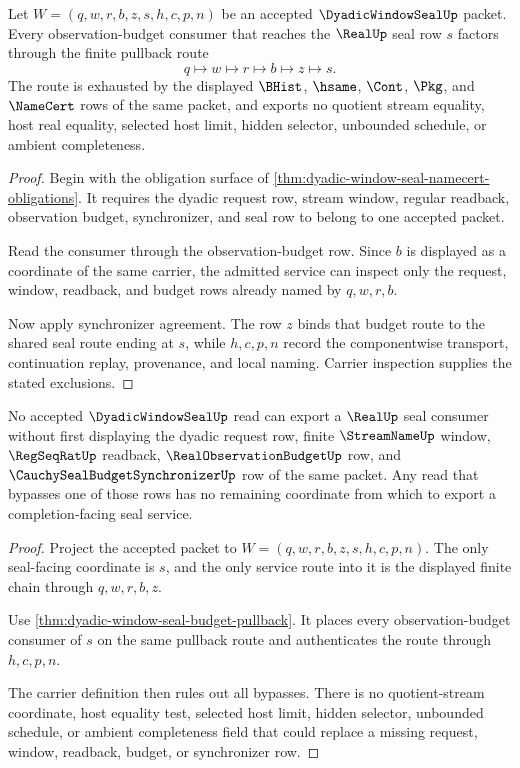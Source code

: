 \begin{theorem}
\label{thm:dyadic-window-seal-budget-pullback}
Let $W=(q,w,r,b,z,s,h,c,p,n)$ be an accepted $\DyadicWindowSealUp$ packet. Every observation-budget consumer that reaches the $\RealUp$ seal row $s$ factors through the finite pullback route
$$
q \longmapsto w \longmapsto r \longmapsto b \longmapsto z \longmapsto s.
$$
The route is exhausted by the displayed $\BHist$, $\hsame$, $\Cont$, $\Pkg$, and $\NameCert$ rows of the same packet, and exports no quotient stream equality, host real equality, selected host limit, hidden selector, unbounded schedule, or ambient completeness.
\end{theorem}
\begin{proof}
Begin with the obligation surface of \autoref{thm:dyadic-window-seal-namecert-obligations}. It requires the dyadic request row, stream window, regular readback, observation budget, synchronizer, and seal row to belong to one accepted packet.

Read the consumer through the observation-budget row. Since $b$ is displayed as a coordinate of the same carrier, the admitted service can inspect only the request, window, readback, and budget rows already named by $q,w,r,b$.

Now apply synchronizer agreement. The row $z$ binds that budget route to the shared seal route ending at $s$, while $h,c,p,n$ record the componentwise transport, continuation replay, provenance, and local naming. Carrier inspection supplies the stated exclusions.
\end{proof}

\begin{theorem}
\label{thm:dyadic-window-seal-nonescape}
No accepted $\DyadicWindowSealUp$ read can export a $\RealUp$ seal consumer without first displaying the dyadic request row, finite $\StreamNameUp$ window, $\RegSeqRatUp$ readback, $\RealObservationBudgetUp$ row, and $\CauchySealBudgetSynchronizerUp$ row of the same packet. Any read that bypasses one of those rows has no remaining coordinate from which to export a completion-facing seal service.
\end{theorem}
\begin{proof}
Project the accepted packet to $W=(q,w,r,b,z,s,h,c,p,n)$. The only seal-facing coordinate is $s$, and the only service route into it is the displayed finite chain through $q,w,r,b,z$.

Use \autoref{thm:dyadic-window-seal-budget-pullback}. It places every observation-budget consumer of $s$ on the same pullback route and authenticates the route through $h,c,p,n$.

The carrier definition then rules out all bypasses. There is no quotient-stream coordinate, host equality test, selected host limit, hidden selector, unbounded schedule, or ambient completeness field that could replace a missing request, window, readback, budget, or synchronizer row.
\end{proof}

